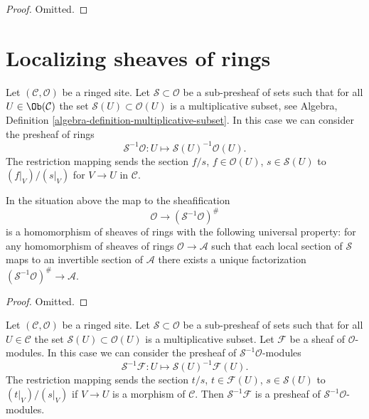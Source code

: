 \begin{proof}
Omitted.
\end{proof}











\section{Localizing sheaves of rings}
\label{section-localizing-sheaves-rings}

\noindent
Let $(\mathcal{C}, \mathcal{O})$ be a ringed site.
Let $\mathcal{S} \subset \mathcal{O}$ be a sub-presheaf of sets
such that for all $U \in \Ob(\mathcal{C})$ the set
$\mathcal{S}(U) \subset \mathcal{O}(U)$ is a multiplicative subset, see
Algebra, Definition \ref{algebra-definition-multiplicative-subset}.
In this case we can consider the presheaf of rings
$$
\mathcal{S}^{-1}\mathcal{O} :
U \longmapsto \mathcal{S}(U)^{-1}\mathcal{O}(U).
$$
The restriction mapping sends the section
$f/s$, $f \in \mathcal{O}(U)$, $s \in \mathcal{S}(U)$
to $(f|_V)/(s|_V)$ for $V \to U$ in $\mathcal{C}$.

\begin{lemma}
\label{lemma-simple-invert}
In the situation above the map to the sheafification
$$
\mathcal{O} \longrightarrow (\mathcal{S}^{-1}\mathcal{O})^\#
$$
is a homomorphism of sheaves of rings with the following
universal property: for any homomorphism of sheaves of rings
$\mathcal{O} \to \mathcal{A}$ such that each local section
of $\mathcal{S}$ maps to an invertible section of $\mathcal{A}$
there exists a unique factorization
$(\mathcal{S}^{-1}\mathcal{O})^\# \to \mathcal{A}$.
\end{lemma}

\begin{proof}
Omitted.
\end{proof}

\noindent
Let $(\mathcal{C}, \mathcal{O})$ be a ringed site.
Let $\mathcal{S} \subset \mathcal{O}$
be a sub-presheaf of sets such that for all $U \in \mathcal{C}$ the set
$\mathcal{S}(U) \subset \mathcal{O}(U)$ is a multiplicative subset.
Let $\mathcal{F}$ be a sheaf of $\mathcal{O}$-modules.
In this case we can consider the presheaf of
$\mathcal{S}^{-1}\mathcal{O}$-modules
$$
\mathcal{S}^{-1}\mathcal{F} :
U \longmapsto \mathcal{S}(U)^{-1}\mathcal{F}(U).
$$
The restriction mapping sends the section $t/s$, $t \in \mathcal{F}(U)$,
$s \in \mathcal{S}(U)$ to $(t|_V)/(s|_V)$ if $V \to U$ is a morphism
of $\mathcal{C}$. Then $\mathcal{S}^{-1}\mathcal{F}$ is a presheaf
of $\mathcal{S}^{-1}\mathcal{O}$-modules.

